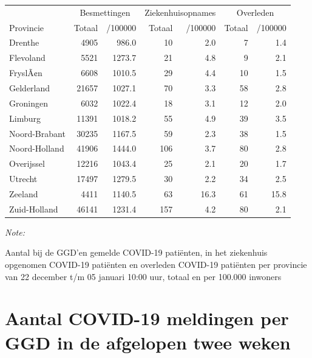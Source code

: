 \documentclass[
  english,
  man,floatsintext]{apa6}
\begin{document}
\begin{table}
\centering
\begin{threeparttable}
\begin{tabular}{lrrrrrr}
\toprule
\multicolumn{1}{c}{ } & \multicolumn{2}{c}{Besmettingen} & \multicolumn{2}{c}{Ziekenhuisopnames} & \multicolumn{2}{c}{Overleden} \\
\cmidrule(l{3pt}r{3pt}){2-3} \cmidrule(l{3pt}r{3pt}){4-5} \cmidrule(l{3pt}r{3pt}){6-7}
Provincie & Totaal & /100000 & Totaal & /100000 & Totaal & /100000\\
\midrule
Drenthe & 4905 & 986.0 & 10 & 2.0 & 7 & 1.4\\
Flevoland & 5521 & 1273.7 & 21 & 4.8 & 9 & 2.1\\
FryslÃ¢n & 6608 & 1010.5 & 29 & 4.4 & 10 & 1.5\\
Gelderland & 21657 & 1027.1 & 70 & 3.3 & 58 & 2.8\\
Groningen & 6032 & 1022.4 & 18 & 3.1 & 12 & 2.0\\
Limburg & 11391 & 1018.2 & 55 & 4.9 & 39 & 3.5\\
Noord-Brabant & 30235 & 1167.5 & 59 & 2.3 & 38 & 1.5\\
Noord-Holland & 41906 & 1444.0 & 106 & 3.7 & 80 & 2.8\\
Overijssel & 12216 & 1043.4 & 25 & 2.1 & 20 & 1.7\\
Utrecht & 17497 & 1279.5 & 30 & 2.2 & 34 & 2.5\\
Zeeland & 4411 & 1140.5 & 63 & 16.3 & 61 & 15.8\\
Zuid-Holland & 46141 & 1231.4 & 157 & 4.2 & 80 & 2.1\\
\bottomrule
\end{tabular}
\begin{tablenotes}
\item \textit{Note: } 
\item Aantal bij de GGD’en gemelde COVID-19 patiënten, in het ziekenhuis opgenomen COVID-19 patiënten en overleden COVID-19 patiënten per provincie van 22 december t/m 05 januari 10:00 uur, totaal en per 100.000 inwoners
\end{tablenotes}
\end{threeparttable}
\end{table}

\newpage

\hypertarget{aantal-covid-19-meldingen-per-ggd-in-de-afgelopen-twee-weken}{%
\section{Aantal COVID-19 meldingen per GGD in de afgelopen twee weken}\label{aantal-covid-19-meldingen-per-ggd-in-de-afgelopen-twee-weken}}
\end{document}
